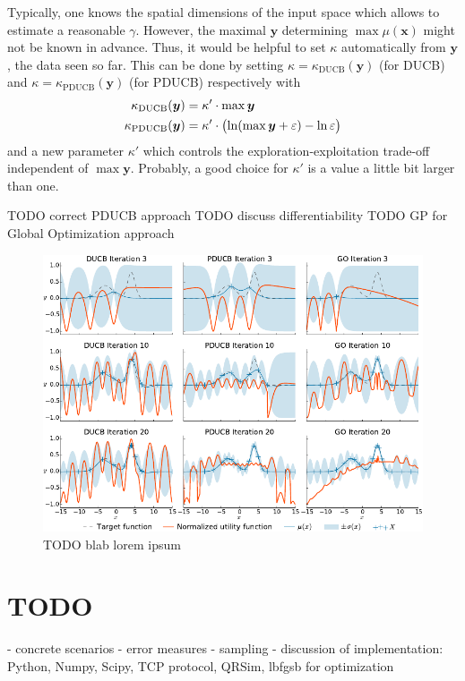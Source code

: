 \documentclass[11pt,a4paper]{scrreprt}
\newcommand{\vc}[1]{\bm{#1}}
\begin{document}
Typically, one knows the spatial dimensions of the input space which allows to 
estimate a reasonable $\gamma$. However, the maximal $\vc y$ determining $\max 
\mu(\vc x)$ might not be known in advance. Thus, it would be helpful to set 
$\kappa$ automatically from $\vc y$, the data seen so far. This can be done by 
setting $\kappa = \kappa_{\text{DUCB}}(\vc y)$ (for DUCB) and $\kappa 
= \kappa_{\text{PDUCB}}(\vc y)$ (for PDUCB) respectively with
\begin{align}
    \kappa_{\text{DUCB}}(\vc y) &= \kappa' \cdot \max \vc y \\
    \kappa_{\text{PDUCB}}(\vc y) &= \kappa' \cdot \del{\ln(\max \vc 
        y + \varepsilon) - \ln \varepsilon}
\end{align}
and a new parameter $\kappa'$ which controls the exploration-exploitation 
trade-off independent of $\max \vc y$. Probably, a good choice for $\kappa'$ is 
a value a little bit larger than one.

TODO correct PDUCB approach
TODO discuss differentiability
TODO GP for Global Optimization approach
\the\textwidth

\begin{figure}
    \centering
    \includegraphics{plots/acqfns}
    \caption{TODO blab lorem ipsum}
\end{figure}



\chapter{TODO}
- concrete scenarios
- error measures
- sampling
- discussion of implementation: Python, Numpy, Scipy, TCP protocol, QRSim, 
lbfgsb for optimization

\printbibliography
\end{document}
